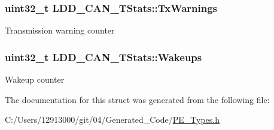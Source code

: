 \subsubsection[{Tx\+Warnings}]{\setlength{\rightskip}{0pt plus 5cm}uint32\+\_\+t L\+D\+D\+\_\+\+C\+A\+N\+\_\+\+T\+Stats\+::\+Tx\+Warnings}\label{struct_l_d_d___c_a_n___t_stats_a46ea9a5839da88b7e7b596ac34b72f90}
Transmission warning counter \hypertarget{struct_l_d_d___c_a_n___t_stats_ab59425105119b5b6496a6e0fcc8398d5}{}
\subsubsection[{Wakeups}]{\setlength{\rightskip}{0pt plus 5cm}uint32\+\_\+t L\+D\+D\+\_\+\+C\+A\+N\+\_\+\+T\+Stats\+::\+Wakeups}\label{struct_l_d_d___c_a_n___t_stats_ab59425105119b5b6496a6e0fcc8398d5}
Wakeup counter 

The documentation for this struct was generated from the following file\+:\begin{DoxyCompactItemize}
\item 
C\+:/\+Users/12913000/git/04/\+Generated\+\_\+\+Code/\hyperlink{_p_e___types_8h}{P\+E\+\_\+\+Types.\+h}\end{DoxyCompactItemize}
